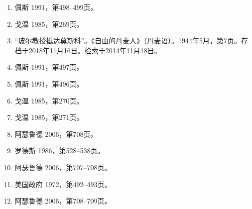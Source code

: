 \begin{enumerate}
\item 佩斯 1991，第498–499页。

\item 戈温 1985，第269页。

\item “玻尔教授抵达莫斯科”。《自由的丹麦人》（丹麦语）。1944年5月，第7页。存档于2018年11月16日。检索于2014年11月18日。

\item 佩斯 1991，第497页。

\item 佩斯 1991，第496页。

\item 戈温 1985，第270页。

\item 戈温 1985，第271页。

\item 阿瑟鲁德 2006，第708页。

\item 罗德斯 1986，第528–538页。

\item 阿瑟鲁德 2006，第707–708页。

\item 美国政府 1972，第492–493页。

\item 阿瑟鲁德 2006，第708–709页。


\end{enumerate}